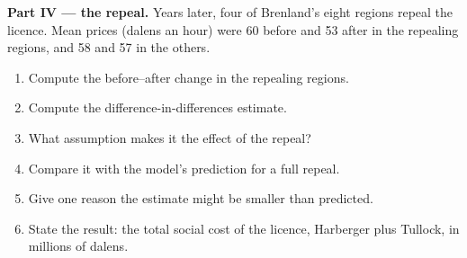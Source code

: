 \begin{problem}
\medskip\noindent\textbf{Part IV --- the repeal.} Years later, four of Brenland's eight
regions repeal the licence. Mean prices (dalens an hour) were 60 before and 53 after in
the repealing regions, and 58 and 57 in the others.
\begin{enumerate}[resume]
\item Compute the before--after change in the repealing regions.
\item Compute the difference-in-differences estimate.
\item What assumption makes it the effect of the repeal?
\item Compare it with the model's prediction for a full repeal.
\item Give one reason the estimate might be smaller than predicted.
\item State the result: the total social cost of the licence, Harberger plus Tullock,
in millions of dalens.
\end{enumerate}
\end{problem}
